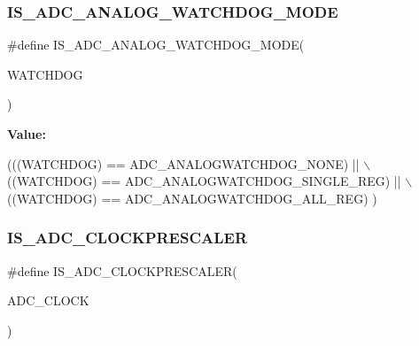 \subsubsection{\texorpdfstring{I\+S\+\_\+\+A\+D\+C\+\_\+\+A\+N\+A\+L\+O\+G\+\_\+\+W\+A\+T\+C\+H\+D\+O\+G\+\_\+\+M\+O\+DE}{IS\_ADC\_ANALOG\_WATCHDOG\_MODE}}
{\footnotesize\ttfamily \#define I\+S\+\_\+\+A\+D\+C\+\_\+\+A\+N\+A\+L\+O\+G\+\_\+\+W\+A\+T\+C\+H\+D\+O\+G\+\_\+\+M\+O\+DE(\begin{DoxyParamCaption}\item[{}]{W\+A\+T\+C\+H\+D\+OG }\end{DoxyParamCaption})}

{\bfseries Value\+:}
\begin{DoxyCode}
(((WATCHDOG) == ADC\_ANALOGWATCHDOG\_NONE)             || \(\backslash\)
                                               ((WATCHDOG) == ADC\_ANALOGWATCHDOG\_SINGLE\_REG)       || \(\backslash\)
                                               ((WATCHDOG) == ADC\_ANALOGWATCHDOG\_ALL\_REG)            )
\end{DoxyCode}
\mbox{\label{group___a_d_c___private___macros_ga519de99233de22e355a7702a7dab2f06}} 
\subsubsection{\texorpdfstring{I\+S\+\_\+\+A\+D\+C\+\_\+\+C\+L\+O\+C\+K\+P\+R\+E\+S\+C\+A\+L\+ER}{IS\_ADC\_CLOCKPRESCALER}}
{\footnotesize\ttfamily \#define I\+S\+\_\+\+A\+D\+C\+\_\+\+C\+L\+O\+C\+K\+P\+R\+E\+S\+C\+A\+L\+ER(\begin{DoxyParamCaption}\item[{}]{A\+D\+C\+\_\+\+C\+L\+O\+CK }\end{DoxyParamCaption})}

